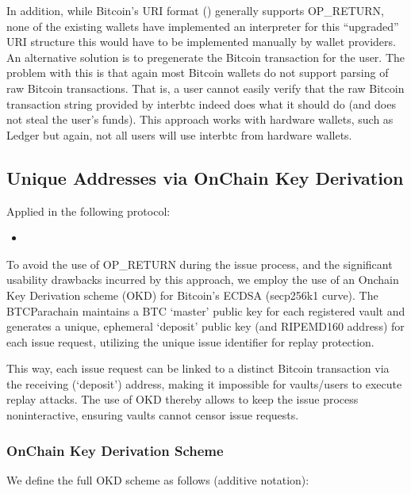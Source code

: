 \documentclass[a4paper,10pt,english]{sphinxmanual}
\begin{document}
In addition, while Bitcoin’s URI format () generally supports OP\_RETURN, none of the existing wallets have implemented an interpreter for this “upgraded” URI structure \sphinxhyphen{} this would have to be implemented manually by wallet providers.
An alternative solution is to pre\sphinxhyphen{}generate the Bitcoin transaction for the user. The problem with this is that \sphinxhyphen{} again \sphinxhyphen{} most Bitcoin wallets do not support parsing of raw Bitcoin transactions. That is, a user cannot easily verify that the raw Bitcoin transaction string provided by interbtc indeed does what it should do (and does not steal the user’s funds). This approach works with hardware wallets, such as Ledger \sphinxhyphen{} but again, not all users will use interbtc from hardware wallets.


\subsection{Unique Addresses via On\sphinxhyphen{}Chain Key Derivation}
\label{\detokenize{security_performance/security-analysis:unique-addresses-via-on-chain-key-derivation}}
Applied in the following protocol:
\begin{itemize}
\item {} 
{\hyperref[\detokenize{spec/issue:issue-protocol}]{}}

\end{itemize}

To avoid the use of OP\_RETURN during the issue process, and the significant usability drawbacks incurred by this approach, we employ the use of an On\sphinxhyphen{}chain Key Derivation scheme (OKD) for Bitcoin’s ECDSA (secp256k1 curve). The BTC\sphinxhyphen{}Parachain maintains a BTC ‘master’ public key for each registered vault and generates a unique, ephemeral ‘deposit’ public key (and RIPEMD\sphinxhyphen{}160 address) for each issue request, utilizing the unique issue identifier for replay protection.

This way, each issue request can be linked to a distinct Bitcoin transaction via the receiving (‘deposit’) address, making it impossible for vaults/users to execute replay attacks. The use of OKD thereby allows to keep the issue process non\sphinxhyphen{}interactive, ensuring vaults cannot censor issue requests.


\subsubsection{On\sphinxhyphen{}Chain Key Derivation Scheme}
\label{\detokenize{security_performance/security-analysis:on-chain-key-derivation-scheme}}\label{\detokenize{security_performance/security-analysis:okd}}
We define the full OKD scheme as follows (additive notation):
\end{document}
